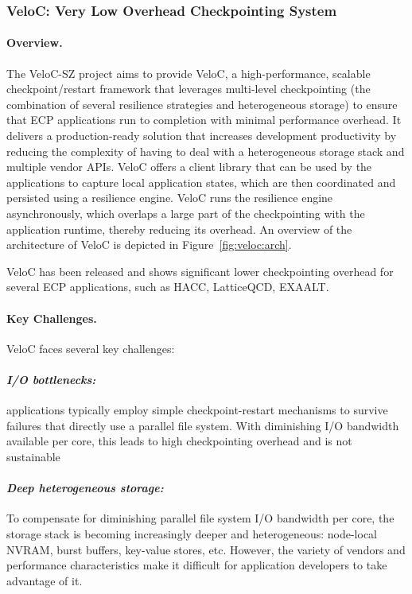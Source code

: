 \subsubsection{ VeloC: Very Low Overhead Checkpointing System}

\paragraph{Overview.}
The VeloC-SZ project aims to provide VeloC, a high-performance,
scalable checkpoint/restart framework that leverages multi-level
checkpointing (the combination of several resilience strategies and
heterogeneous storage) to ensure that ECP applications run to
completion with minimal performance overhead. It delivers a
production-ready solution that increases development productivity by
reducing the complexity of having to deal with a heterogeneous storage
stack and multiple vendor APIs. VeloC offers a client library that can
be used by the applications to capture local application states, which
are then coordinated and persisted using a resilience engine.  VeloC
runs the resilience engine asynchronously, which overlaps a large part
of the checkpointing with the application runtime, thereby reducing
its overhead. An overview of the architecture of VeloC is depicted
in Figure~\ref{fig:veloc:arch}.

VeloC has been released and shows significant lower checkpointing
overhead for several ECP applications, such as HACC, LatticeQCD,
EXAALT. 

\paragraph{Key Challenges.}
VeloC faces several key challenges:
\vspace{-1em}

\paragraph{\emph{I/O bottlenecks:}} applications typically employ
simple checkpoint-restart mechanisms to survive failures that directly
use a parallel file system. With diminishing I/O bandwidth available
per core, this leads to high checkpointing overhead and is not
sustainable
\vspace{-1em}

\paragraph{\emph{Deep heterogeneous storage:}} To compensate for
diminishing parallel file system I/O bandwidth per core, the storage
stack is becoming increasingly deeper and heterogeneous: node-local
NVRAM, burst buffers, key-value stores, etc. However, the variety of
vendors and performance characteristics make it difficult for
application developers to take advantage of it.
\vspace{-1em}

